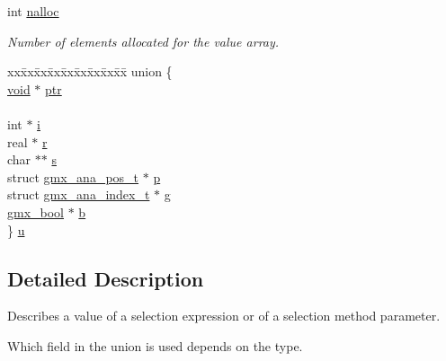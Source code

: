 \begin{DoxyCompactItemize}
\begin{tabbing}
\end{tabbing}\item 
int \hyperlink{structgmx__ana__selvalue__t_a7f0a3a02a38a85dfc48611d126779a23}{nalloc}
\begin{DoxyCompactList}\small\item\em \-Number of elements allocated for the value array. \end{DoxyCompactList}\item 
\begin{tabbing}
xx\=xx\=xx\=xx\=xx\=xx\=xx\=xx\=xx\=\kill
union \{\\
\>\hyperlink{nbnxn__kernel__simd__4xn__outer_8h_a8dc3f4a797ed992dff49d2fa3477eee8}{void} $\ast$ \hyperlink{structgmx__ana__selvalue__t_a12b279f9954e6c83e9e9957fcde06e81}{ptr}\\
\>\\
\>int $\ast$ \hyperlink{structgmx__ana__selvalue__t_af72b5764d0dbc8bc2c4479cc6f4c8148}{i}\\
\>real $\ast$ \hyperlink{structgmx__ana__selvalue__t_afdab2e1a8e6d0b4157f0d823f063020a}{r}\\
\>char $\ast$$\ast$ \hyperlink{structgmx__ana__selvalue__t_aa4c476a22542ca86519dc9851c08e767}{s}\\
\>struct \hyperlink{structgmx__ana__pos__t}{gmx\_ana\_pos\_t} $\ast$ \hyperlink{structgmx__ana__selvalue__t_a5ac7ec54e9c4bd24a4e1c525eb8ab996}{p}\\
\>struct \hyperlink{structgmx__ana__index__t}{gmx\_ana\_index\_t} $\ast$ \hyperlink{structgmx__ana__selvalue__t_aecb3187d4996ff0548a69f97e258aecb}{g}\\
\>\hyperlink{include_2types_2simple_8h_a8fddad319f226e856400d190198d5151}{gmx\_bool} $\ast$ \hyperlink{structgmx__ana__selvalue__t_a040d77c026d33b7da43871c37c92eebb}{b}\\
\} \hyperlink{structgmx__ana__selvalue__t_a47d85dba2471011f88b5fc779dd85a3e}{u}\\

\end{tabbing}\end{DoxyCompactItemize}


\subsection{\-Detailed \-Description}
\-Describes a value of a selection expression or of a selection method parameter. 

\-Which field in the union is used depends on the {\ttfamily type}. 

